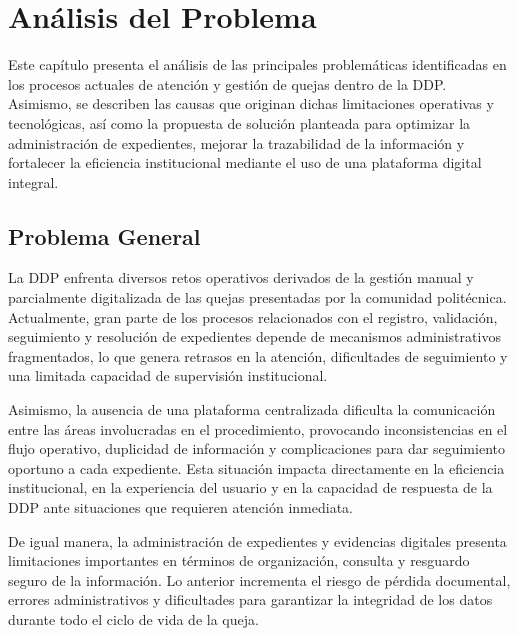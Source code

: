 
\chapter{Análisis del Problema}
\label{cap:analisis_problema}
\justifying

Este capítulo presenta el análisis de las principales problemáticas identificadas en los procesos actuales de atención y gestión de quejas dentro de la DDP. Asimismo, se describen las causas que originan dichas limitaciones operativas y tecnológicas, así como la propuesta de solución planteada para optimizar la administración de expedientes, mejorar la trazabilidad de la información y fortalecer la eficiencia institucional mediante el uso de una plataforma digital integral.

\section{Problema General}

La DDP enfrenta diversos retos operativos derivados de la gestión manual y parcialmente digitalizada de las quejas presentadas por la comunidad politécnica. Actualmente, gran parte de los procesos relacionados con el registro, validación, seguimiento y resolución de expedientes depende de mecanismos administrativos fragmentados, lo que genera retrasos en la atención, dificultades de seguimiento y una limitada capacidad de supervisión institucional.

Asimismo, la ausencia de una plataforma centralizada dificulta la comunicación entre las áreas involucradas en el procedimiento, provocando inconsistencias en el flujo operativo, duplicidad de información y complicaciones para dar seguimiento oportuno a cada expediente. Esta situación impacta directamente en la eficiencia institucional, en la experiencia del usuario y en la capacidad de respuesta de la DDP ante situaciones que requieren atención inmediata.

De igual manera, la administración de expedientes y evidencias digitales presenta limitaciones importantes en términos de organización, consulta y resguardo seguro de la información. Lo anterior incrementa el riesgo de pérdida documental, errores administrativos y dificultades para garantizar la integridad de los datos durante todo el ciclo de vida de la queja.

